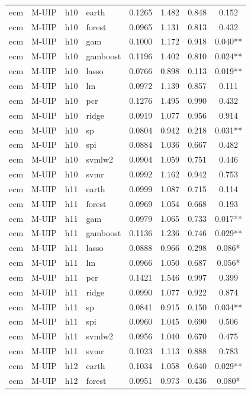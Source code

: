 \begin{ThreePartTable}
\begin{longtable}[t]{llclcccc}
\addlinespace
ecm & M-UIP & h10 & earth & 0.1265 & 1.482 & 0.848 & 0.152\\
ecm & M-UIP & h10 & forest & 0.0965 & 1.131 & 0.813 & 0.432\\
ecm & M-UIP & h10 & gam & 0.1000 & 1.172 & 0.918 & 0.040**\\
ecm & M-UIP & h10 & gamboost & 0.1196 & 1.402 & 0.810 & 0.024**\\
ecm & M-UIP & h10 & lasso & 0.0766 & 0.898 & 0.113 & 0.019**\\
ecm & M-UIP & h10 & lm & 0.0972 & 1.139 & 0.857 & 0.111\\
ecm & M-UIP & h10 & pcr & 0.1276 & 1.495 & 0.990 & 0.432\\
ecm & M-UIP & h10 & ridge & 0.0919 & 1.077 & 0.956 & 0.914\\
ecm & M-UIP & h10 & sp & 0.0804 & 0.942 & 0.218 & 0.031**\\
ecm & M-UIP & h10 & spi & 0.0884 & 1.036 & 0.667 & 0.482\\
ecm & M-UIP & h10 & svmlw2 & 0.0904 & 1.059 & 0.751 & 0.446\\
ecm & M-UIP & h10 & svmr & 0.0992 & 1.162 & 0.942 & 0.753\\
\addlinespace
ecm & M-UIP & h11 & earth & 0.0999 & 1.087 & 0.715 & 0.114\\
ecm & M-UIP & h11 & forest & 0.0969 & 1.054 & 0.668 & 0.193\\
ecm & M-UIP & h11 & gam & 0.0979 & 1.065 & 0.733 & 0.017**\\
ecm & M-UIP & h11 & gamboost & 0.1136 & 1.236 & 0.746 & 0.029**\\
ecm & M-UIP & h11 & lasso & 0.0888 & 0.966 & 0.298 & 0.086*\\
ecm & M-UIP & h11 & lm & 0.0966 & 1.050 & 0.687 & 0.056*\\
ecm & M-UIP & h11 & pcr & 0.1421 & 1.546 & 0.997 & 0.399\\
ecm & M-UIP & h11 & ridge & 0.0990 & 1.077 & 0.922 & 0.874\\
ecm & M-UIP & h11 & sp & 0.0841 & 0.915 & 0.150 & 0.034**\\
ecm & M-UIP & h11 & spi & 0.0960 & 1.045 & 0.690 & 0.506\\
ecm & M-UIP & h11 & svmlw2 & 0.0956 & 1.040 & 0.670 & 0.475\\
ecm & M-UIP & h11 & svmr & 0.1023 & 1.113 & 0.888 & 0.783\\
\addlinespace
ecm & M-UIP & h12 & earth & 0.1034 & 1.058 & 0.640 & 0.029**\\
ecm & M-UIP & h12 & forest & 0.0951 & 0.973 & 0.436 & 0.080*\\

\end{longtable}
\end{ThreePartTable}
